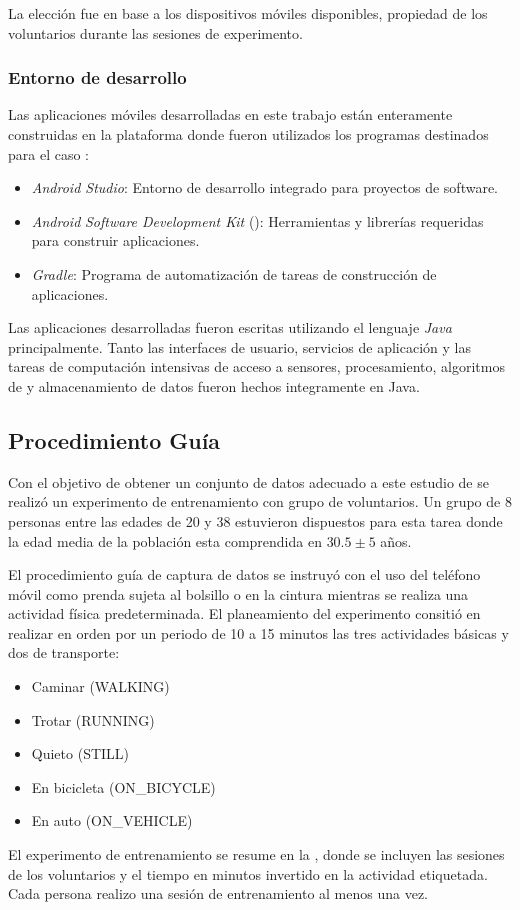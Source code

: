 La elección fue en base a los dispositivos móviles disponibles, propiedad
de los voluntarios durante las sesiones de experimento.

\subsubsection{Entorno de desarrollo }

Las aplicaciones móviles desarrolladas en este trabajo están enteramente
construidas en la plataforma \emph{} donde fueron utilizados
los programas destinados para el caso \cite{Android2016}:
\begin{itemize}
\item \emph{Android Studio}: Entorno de desarrollo integrado para proyectos\emph{
}de software.
\item \emph{Android} \emph{Software Development Kit }(): Herramientas
y librerías  requeridas para construir aplicaciones.
\item \emph{Gradle}: Programa de automatización de tareas de construcción
de aplicaciones.
\end{itemize}
Las aplicaciones desarrolladas fueron escritas utilizando el lenguaje
\emph{Java }principalmente. Tanto las interfaces de usuario, servicios
de aplicación y las tareas de computación intensivas de acceso a sensores,
procesamiento, algoritmos de  y almacenamiento de datos
fueron hechos integramente en Java.

\subsection{Procedimiento Guía }

Con el objetivo de obtener un conjunto de datos adecuado a este estudio
de  se realizó un experimento de entrenamiento con grupo
de voluntarios. Un grupo de 8 personas entre las edades de 20 y 38
estuvieron dispuestos para esta tarea donde la edad media de la población
esta comprendida en $30.5\pm5$ años. 

El procedimiento guía de captura de datos se instruyó con el uso del
teléfono móvil como prenda sujeta al bolsillo o en la cintura mientras
se realiza una actividad física predeterminada. El planeamiento del
experimento consitió en realizar en orden por un periodo de 10 a 15
minutos las tres actividades básicas y dos de transporte:
\begin{itemize}
\item Caminar (WALKING)
\item Trotar (RUNNING)
\item Quieto (STILL)
\item En bicicleta (ON\_BICYCLE)
\item En auto (ON\_VEHICLE)
\end{itemize}
El experimento de entrenamiento se resume en la ,
donde se incluyen las sesiones de los voluntarios y el tiempo en minutos
invertido en la actividad etiquetada. Cada persona realizo una sesión
de entrenamiento al menos una vez.


